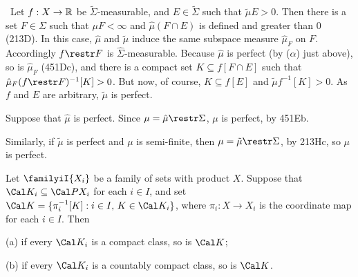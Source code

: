 {\medskip

\qquad\grheadb\ Let $f:X\to\Bbb R$ be $\tilde\Sigma$-measurable,
and $E\in\tilde\Sigma$ such
that $\tilde\mu E>0$.   Then there is a set $F\in\Sigma$ such that
$\mu F<\infty$ and $\hat\mu(F\cap E)$ is defined and greater than $0$
(213D).   In this case, $\hat\mu$ and $\tilde\mu$ induce the same
subspace measure
$\hat\mu_F$ on $F$.   Accordingly $f\restr F$ is
$\hat\Sigma$-measurable.   Because $\hat\mu$ is perfect (by ($\alpha$)
just above), so is $\hat\mu_F$ (451Dc), and there is a compact set
$K\subseteq f[F\cap E]$ such that $\hat\mu_F(f\restr F)^{-1}[K]>0$.
But now, of course, $K\subseteq f[E]$ and $\tilde\mu f^{-1}[K]>0$.   As
$f$ and $E$ are arbitrary, $\tilde\mu$ is perfect.

\medskip

 Suppose that $\hat\mu$ is perfect.   Since
$\mu=\hat\mu\restr\Sigma$, $\mu$ is perfect, by 451Eb.

\medskip

 Similarly, if $\tilde\mu$ is perfect and $\mu$ is
semi-finite, then $\mu=\tilde\mu\restr\Sigma$, by 213Hc, so
$\mu$ is perfect.
}%

 Let $\familyiI{X_i}$ be a family of sets with
product $X$.   Suppose that $\Cal K_i\subseteq\Cal PX_i$ for each $i\in
I$, and set $\Cal K=\{\pi_i^{-1}[K]:i\in I,\,K\in\Cal K_i\}$, where
$\pi_i:X\to X_i$ is the coordinate map for each $i\in I$.   Then

(a) if every $\Cal K_i$ is a compact class, so is $\Cal K$;

(b) if every $\Cal K_i$ is a countably compact class, so is $\Cal K$.


